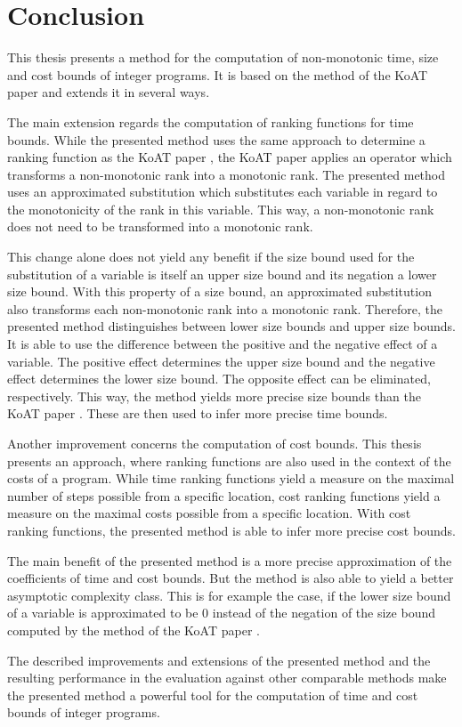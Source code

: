 \section{Conclusion}

This thesis presents a method for the computation of non-monotonic time, size and cost bounds of integer programs.
It is based on the method of the KoAT paper \cite{koat} and extends it in several ways.

The main extension regards the computation of ranking functions for time bounds.
While the presented method uses the same approach to determine a ranking function as the KoAT paper \cite{koat}, the KoAT paper applies an operator which transforms a non-monotonic rank into a monotonic rank.
The presented method uses an approximated substitution which substitutes each variable in regard to the monotonicity of the rank in this variable.
This way, a non-monotonic rank does not need to be transformed into a monotonic rank.

This change alone does not yield any benefit if the size bound used for the substitution of a variable is itself an upper size bound and its negation a lower size bound.
With this property of a size bound, an approximated substitution also transforms each non-monotonic rank into a monotonic rank.
Therefore, the presented method distinguishes between lower size bounds and upper size bounds.
It is able to use the difference between the positive and the negative effect of a variable.
The positive effect determines the upper size bound and the negative effect determines the lower size bound.
The opposite effect can be eliminated, respectively.
This way, the method yields more precise size bounds than the KoAT paper \cite{koat}.
These are then used to infer more precise time bounds.

Another improvement concerns the computation of cost bounds.
This thesis presents an approach, where ranking functions are also used in the context of the costs of a program.
While time ranking functions yield a measure on the maximal number of steps possible from a specific location, cost ranking functions yield a measure on the maximal costs possible from a specific location.
With cost ranking functions, the presented method is able to infer more precise cost bounds.

The main benefit of the presented method is a more precise approximation of the coefficients of time and cost bounds.
But the method is also able to yield a better asymptotic complexity class.
This is for example the case, if the lower size bound of a variable is approximated to be $0$ instead of the negation of the size bound computed by the method of the KoAT paper \cite{koat}.

The described improvements and extensions of the presented method and the resulting performance in the evaluation against other comparable methods make the presented method a powerful tool for the computation of time and cost bounds of integer programs.
